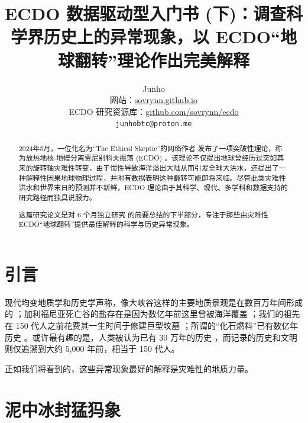 \documentclass[10pt,twocolumn,letterpaper]{article}
\begin{document}
\title{ECDO 数据驱动型入门书 (下)：调查科学界历史上的异常现象，以 ECDO“地球翻转”理论作出完美解释}

\author{Junho\\
网站：\href{https://sovrynn.github.io}{sovrynn.github.io}\\
ECDO 研究资源库：\href{https://github.com/sovrynn/ecdo}{github.com/sovrynn/ecdo}\\
{\tt\small junhobtc@proton.me}
}

\maketitle

\begin{abstract}
2024年5月，一位化名为“The Ethical Skeptic”的网络作者 \cite{0} 发布了一项突破性理论，称为放热地核-地幔分离贾尼别科夫振荡 (ECDO) \cite{1}。该理论不仅提出地球曾经历过突如其来的旋转轴灾难性转变，由于惯性导致海洋溢出大陆从而引发全球大洪水，还提出了一种解释性因果地球物理过程，并附有数据表明这种翻转可能即将来临。尽管此类灾难性洪水和世界末日的预测并不新鲜，ECDO 理论由于其科学、现代、多学科和数据支持的研究路径而独具说服力。

这篇研究论文是对 6 个月独立研究 \cite{2,20} 的简要总结的下半部分，专注于那些由灾难性 ECDO“地球翻转”提供最佳解释的科学与历史异常现象。

\end{abstract}


\section{引言}

现代均变地质学和历史学声称，像大峡谷这样的主要地质景观是在数百万年间形成的 \cite{143}；加利福尼亚死亡谷的盐存在是因为数亿年前这里曾被海洋覆盖 \cite{144}；我们的祖先在 150 代人之前花费其一生时间于修建巨型坟墓 \cite{29,70}；所谓的“化石燃料”已有数亿年历史 \cite{104}。或许最有趣的是，人类被认为已有 30 万年的历史 \cite{145}，而记录的历史和文明则仅追溯到大约 5,000 年前，相当于 150 代人。

正如我们将看到的，这些异常现象最好的解释是灾难性的地质力量。

\section{泥中冰封猛犸象}
\end{document}
